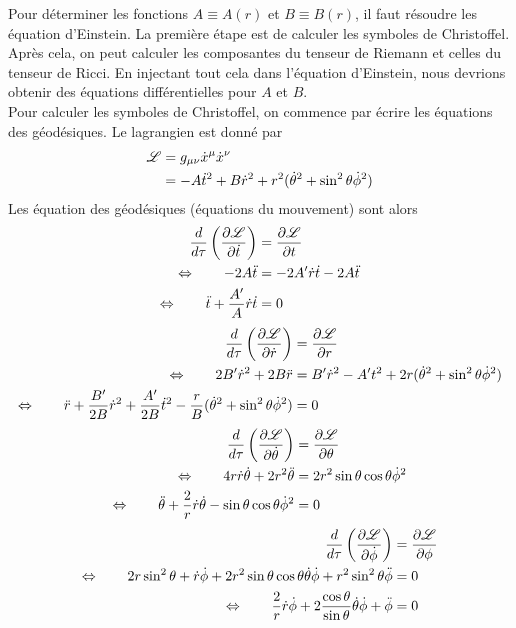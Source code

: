 \documentclass[a4paper,11pt]{report}
\begin{document}
        Pour déterminer les fonctions $A\equiv A(r)$ et $B\equiv B(r)$, il faut résoudre les équation d'Einstein. La première étape est de calculer les symboles de Christoffel. Après cela, on peut calculer les composantes du tenseur de Riemann et celles du tenseur de Ricci. En injectant tout cela dans l'équation d'Einstein, nous devrions obtenir des équations différentielles pour $A$ et $B$.\\
        
        Pour calculer les symboles de Christoffel, on commence par écrire les équations des géodésiques. Le lagrangien est donné par
        \begin{align}
            \mathscr{L} &= g_{\mu\nu}\dot{x}^\mu\dot{x}^\nu \\
            &= -A\dot{t}^2+B\dot{r}^2+r^2(\dot{\theta}^2+\sin^2\theta\dot{\phi}^2)
        \end{align}
        Les équation des géodésiques (équations du mouvement) sont alors
        \begin{align}
            \frac{d}{d\tau}\left( \pdv{\mathscr{L}}{\dot{t}} \right) &= \pdv{\mathscr{L}}{t} \\
            \Leftrightarrow\qquad -2A \ddot{t} &= -2A'\dot{r}\dot{t}-2A\ddot{t}\\
            \Leftrightarrow\qquad \ddot{t}+\frac{A'}{A}\dot{r}\dot{t} &= 0
        \end{align}
        \begin{align}
            \frac{d}{d\tau}\left( \pdv{\mathscr{L}}{\dot{r}} \right) &= \pdv{\mathscr{L}}{r} \\
            \Leftrightarrow\qquad 2B'\dot{r}^2+2B\ddot{r} &= B'\dot{r}^2-A't^2+2r(\dot{\theta}^2+\sin^2\theta\dot{\phi}^2)\\
            \Leftrightarrow\qquad \ddot{r}+\frac{B'}{2B}\dot{r}^2+\frac{A'}{2B}\dot{t}^2-\frac{r}{B}(\dot{\theta}^2+\sin^2\theta\dot{\phi}^2) &= 0
        \end{align}
        \begin{align}
            \frac{d}{d\tau}\left( \pdv{\mathscr{L}}{\dot{\theta}} \right) &= \pdv{\mathscr{L}}{\theta} \\
            \Leftrightarrow\qquad 4r\dot{r}\dot{\theta}+2r^2\ddot{\theta}&=2r^2\sin\theta\cos\theta\dot{\phi}^2\\
            \Leftrightarrow\qquad \ddot{\theta}+\frac{2}{r}\dot{r}\dot{\theta}-\sin\theta\cos\theta\dot{\phi}^2 &= 0
        \end{align}
        \begin{align}
            \frac{d}{d\tau}\left( \pdv{\mathscr{L}}{\dot{\phi}} \right) &= \pdv{\mathscr{L}}{\phi} \\
            \Leftrightarrow\qquad 2r\sin^2\theta+\dot{r}\dot{\phi}+2r^2\sin\theta\cos\theta\dot{\theta}\dot{\phi}+r^2\sin^2\theta\ddot{\phi}&= 0\\
            \Leftrightarrow\qquad \frac{2}{r}\dot{r}\dot{\phi}+2\frac{\cos\theta}{\sin\theta}\dot\theta\dot{\phi}+\ddot{\phi} &= 0
        \end{align}
\end{document}
